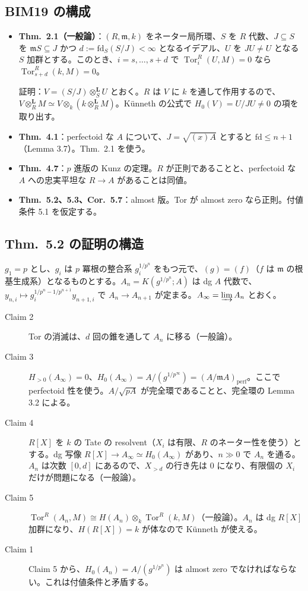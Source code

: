 \documentclass[11pt,a4paper]{ltjsarticle}
\theoremstyle{plain}
\theoremstyle{definition}
\theoremstyle{remark}
\theoremstyle{plain}
\newcommand{\m}{\mathfrak{m}}
\newcommand{\Tor}{\operatorname{Tor}}
\begin{document}
\subsection{BIM19 の構成}
\begin{itemize}
  \item \textbf{Thm.~2.1（一般論）}：$(R,\m,k)$ をネーター局所環、$S$ を $R$ 代数、$J\subseteq S$ を $\m S\subseteq J$ かつ $d := \mathrm{fd}_S(S/J)<\infty$ となるイデアル、$U$ を $JU\ne U$ となる $S$ 加群とする。このとき、$i = s,\dots,s+d$ で $\Tor^R_i(U,M) = 0$ なら $\Tor^R_{s+d}(k,M) = 0$。

  証明：$V = (S/J)\otimes^{\mathbf L}_SU$ とおく。$R$ は $V$ に $k$ を通して作用するので、$V\otimes^{\mathbf L}_RM\simeq V\otimes_k(k\otimes^{\mathbf L}_RM)$。Künneth の公式で $H_0(V) = U/JU\neq0$ の項を取り出す。
  \item \textbf{Thm.~4.1}：perfectoid な $A$ について、$J = \sqrt{(x)A}$ とすると $\mathrm{fd}\le n+1$（Lemma 3.7）。Thm.~2.1 を使う。
  \item \textbf{Thm.~4.7}：$p$ 進版の Kunz の定理。$R$ が正則であることと、perfectoid な $A$ への忠実平坦な $R\to A$ があることは同値。
  \item \textbf{Thm.~5.2、5.3、Cor.~5.7}：almost 版。Tor が almost zero なら正則。付値条件 5.1 を仮定する。
\end{itemize}

\subsection{Thm.~5.2 の証明の構造}
$g_1 = p$ とし、$g_i$ は $p$ 冪根の整合系 $g_i^{1/p^n}$ をもつ元で、$(g) = (f)$（$f$ は $\m$ の根基生成系）となるものとする。$A_n = K(g^{1/p^n};A)$ は dg $A$ 代数で、$y_{n,i}\mapsto g_i^{1/p^n-1/p^{n+1}}y_{n+1,i}$ で $A_n\to A_{n+1}$ が定まる。$A_\infty = \varinjlim A_n$ とおく。
\begin{description}
  \item[Claim 2] Tor の消滅は、$d$ 回の錐を通して $A_n$ に移る（一般論）。
  \item[Claim 3] $H_{>0}(A_\infty) = 0$、$H_0(A_\infty) = A/(g^{1/p^\infty}) = (A/\m A)_{\mathrm{perf}}$。ここで perfectoid 性を使う。$A/\sqrt{pA}$ が完全環であることと、完全環の Lemma 3.2 による。
  \item[Claim 4] $R[X]$ を $k$ の Tate の resolvent（$X_i$ は有限、$R$ のネーター性を使う）とする。dg 写像 $R[X]\to A_\infty\simeq H_0(A_\infty)$ があり、$n\gg0$ で $A_n$ を通る。$A_n$ は次数 $[0,d]$ にあるので、$X_{>d}$ の行き先は $0$ になり、有限個の $X_i$ だけが問題になる（一般論）。
  \item[Claim 5] $\Tor^R(A_n,M)\cong H(A_n)\otimes_k\Tor^R(k,M)$（一般論）。$A_n$ は dg $R[X]$ 加群になり、$H(R[X]) = k$ が体なので Künneth が使える。
  \item[Claim 1] Claim 5 から、$H_0(A_n) = A/(g^{1/p^n})$ は almost zero でなければならない。これは付値条件と矛盾する。
\end{description}
\end{document}
